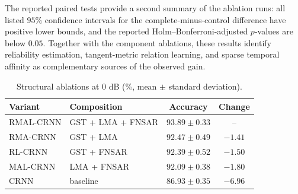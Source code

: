 The reported paired tests provide a second summary of the ablation runs: all listed $95\%$ confidence intervals for the complete-minus-control difference have positive lower bounds, and the reported Holm--Bonferroni-adjusted $p$-values are below $0.05$. Together with the component ablations, these results identify reliability estimation, tangent-metric relation learning, and sparse temporal affinity as complementary sources of the observed gain.

\begin{table}[t]
\caption{Structural ablations at $0$ dB (\%, mean $\pm$ standard deviation).}
\label{tab:ablation}
\centering
\small
\begin{tabular}{@{}llcc@{}}
\toprule
Variant & Composition & Accuracy & Change\\
\midrule
RMAL-CRNN & GST + LMA + FNSAR & $93.89{\pm}0.33$ & --\\
RMA-CRNN & GST + LMA & $92.47{\pm}0.49$ & $-1.41$\\
RL-CRNN & GST + FNSAR & $92.39{\pm}0.52$ & $-1.50$\\
MAL-CRNN & LMA + FNSAR & $92.09{\pm}0.38$ & $-1.80$\\
CRNN & baseline & $86.93{\pm}0.35$ & $-6.96$\\
\bottomrule
\end{tabular}
\end{table}
